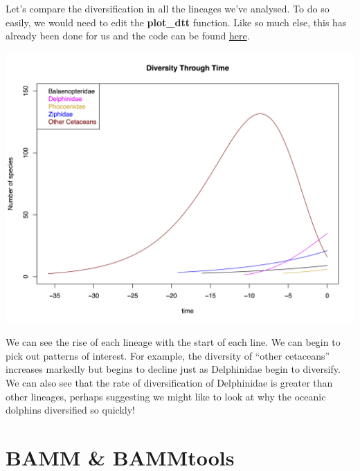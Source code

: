 \documentclass[
]{book}
\newenvironment{Shaded}{\begin{snugshade}}{\end{snugshade}}
\newcommand{\DataTypeTok}[1]{\textcolor[rgb]{0.13,0.29,0.53}{#1}}
\newcommand{\KeywordTok}[1]{\textcolor[rgb]{0.13,0.29,0.53}{\textbf{#1}}}
\newcommand{\NormalTok}[1]{#1}
\newcommand{\OperatorTok}[1]{\textcolor[rgb]{0.81,0.36,0.00}{\textbf{#1}}}
\begin{document}
\begin{Shaded}
\end{Shaded}

Let's compare the diversification in all the lineages we've analysed. To do so easily, we would need to edit the \textbf{plot\_dtt} function. Like so much else, this has already been done for us and the code can be found \href{http://lukejharmon.github.io/ilhabela/instruction/2015/07/02/diversification-analysis-bamm-rpanda/\#rpanda}{here}.

\begin{center}\includegraphics[width=76.04in]{Images/Diversityplot} \end{center}

We can see the rise of each lineage with the start of each line. We can begin to pick out patterns of interest. For example, the diversity of ``other cetaceans'' increases markedly but begins to decline just as Delphinidae begin to diversify. We can also see that the rate of diversification of Delphinidae is greater than other lineages, perhaps suggesting we might like to look at why the oceanic dolphins diversified so quickly!

\hypertarget{bamm-bammtools}{%
\section{BAMM \& BAMMtools}\label{bamm-bammtools}}
\end{document}
